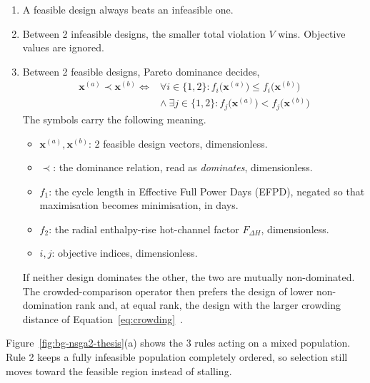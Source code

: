 \begin{enumerate}
  \item A feasible design always beats an infeasible one.

  \item Between 2 infeasible designs, the smaller total violation
        $V$ wins. Objective values are ignored.

  \item Between 2 feasible designs, Pareto dominance decides,
        \begin{equation}
        \begin{split}
          \mathbf{x}^{(a)} \prec \mathbf{x}^{(b)}
          \iff
          & \forall i \in \{1,2\} :
            f_i\bigl(\mathbf{x}^{(a)}\bigr) \le f_i\bigl(\mathbf{x}^{(b)}\bigr) \\
          & \wedge\
            \exists j \in \{1,2\} :
            f_j\bigl(\mathbf{x}^{(a)}\bigr) < f_j\bigl(\mathbf{x}^{(b)}\bigr)
        \end{split}
        \label{eq:pareto-dominance-feasible}
        \end{equation}
        The symbols carry the following meaning.
        \begin{itemize}
          \item $\mathbf{x}^{(a)}, \mathbf{x}^{(b)}$: 2 feasible
                design vectors, dimensionless.
          \item $\prec$: the dominance relation, read as
                \emph{dominates}, dimensionless.
          \item $f_1$: the cycle length in Effective Full Power Days
                (EFPD), negated so that maximisation becomes
                minimisation, in days.
          \item $f_2$: the radial enthalpy-rise hot-channel factor
                $F_{\Delta H}$, dimensionless.
          \item $i, j$: objective indices, dimensionless.
        \end{itemize}
        If neither design dominates the other, the two are mutually
        non-dominated. The crowded-comparison operator then prefers the
        design of lower non-domination rank and, at equal rank, the
        design with the larger crowding distance of
        Equation~\eqref{eq:crowding}~\cite{deb_nsga2_2002}.
\end{enumerate}

Figure~\ref{fig:bg-nsga2-thesis}(a) shows the 3 rules acting on a
mixed population. Rule 2 keeps a fully infeasible population
completely ordered, so selection still moves toward the feasible
region instead of stalling.

